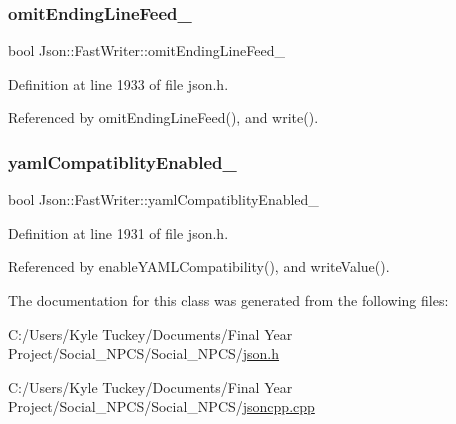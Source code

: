 \subsubsection{\texorpdfstring{omit\+Ending\+Line\+Feed\+\_\+}{omitEndingLineFeed\_}}
{\footnotesize\ttfamily bool Json\+::\+Fast\+Writer\+::omit\+Ending\+Line\+Feed\+\_\+\hspace{0.3cm}{\ttfamily [private]}}



Definition at line 1933 of file json.\+h.



Referenced by omit\+Ending\+Line\+Feed(), and write().

\mbox{\label{class_json_1_1_fast_writer_a4c4c1911179bf472d24492915b0e489a}} 
\subsubsection{\texorpdfstring{yaml\+Compatiblity\+Enabled\+\_\+}{yamlCompatiblityEnabled\_}}
{\footnotesize\ttfamily bool Json\+::\+Fast\+Writer\+::yaml\+Compatiblity\+Enabled\+\_\+\hspace{0.3cm}{\ttfamily [private]}}



Definition at line 1931 of file json.\+h.



Referenced by enable\+Y\+A\+M\+L\+Compatibility(), and write\+Value().



The documentation for this class was generated from the following files\+:\begin{DoxyCompactItemize}
\item 
C\+:/\+Users/\+Kyle Tuckey/\+Documents/\+Final Year Project/\+Social\+\_\+\+N\+P\+C\+S/\+Social\+\_\+\+N\+P\+C\+S/\hyperlink{json_8h}{json.\+h}\item 
C\+:/\+Users/\+Kyle Tuckey/\+Documents/\+Final Year Project/\+Social\+\_\+\+N\+P\+C\+S/\+Social\+\_\+\+N\+P\+C\+S/\hyperlink{jsoncpp_8cpp}{jsoncpp.\+cpp}\end{DoxyCompactItemize}
